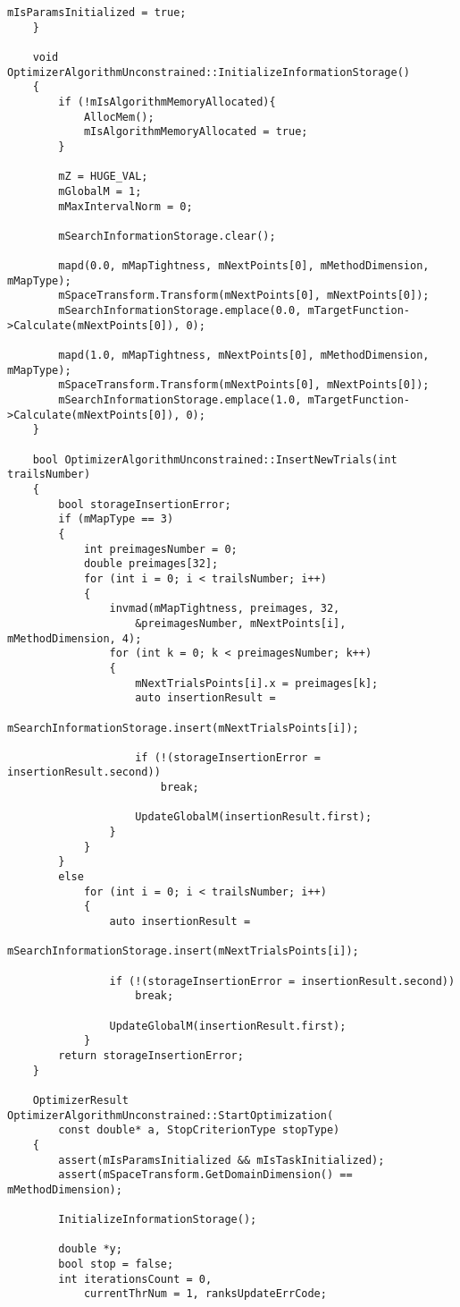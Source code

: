 \begin{lstlisting}[frame=single]
		mIsParamsInitialized = true;
	}

	void OptimizerAlgorithmUnconstrained::InitializeInformationStorage()
	{
		if (!mIsAlgorithmMemoryAllocated){
			AllocMem();
			mIsAlgorithmMemoryAllocated = true;
		}

		mZ = HUGE_VAL;
		mGlobalM = 1;
		mMaxIntervalNorm = 0;

		mSearchInformationStorage.clear();

		mapd(0.0, mMapTightness, mNextPoints[0], mMethodDimension, mMapType);
		mSpaceTransform.Transform(mNextPoints[0], mNextPoints[0]);
		mSearchInformationStorage.emplace(0.0, mTargetFunction->Calculate(mNextPoints[0]), 0);

		mapd(1.0, mMapTightness, mNextPoints[0], mMethodDimension, mMapType);
		mSpaceTransform.Transform(mNextPoints[0], mNextPoints[0]);
		mSearchInformationStorage.emplace(1.0, mTargetFunction->Calculate(mNextPoints[0]), 0);
	}

	bool OptimizerAlgorithmUnconstrained::InsertNewTrials(int trailsNumber)
	{
		bool storageInsertionError;
		if (mMapType == 3)
		{
			int preimagesNumber = 0;
			double preimages[32];
			for (int i = 0; i < trailsNumber; i++)
			{
				invmad(mMapTightness, preimages, 32,
					&preimagesNumber, mNextPoints[i], mMethodDimension, 4);
				for (int k = 0; k < preimagesNumber; k++)
				{
					mNextTrialsPoints[i].x = preimages[k];
					auto insertionResult =
						mSearchInformationStorage.insert(mNextTrialsPoints[i]);

					if (!(storageInsertionError = insertionResult.second))
						break;

					UpdateGlobalM(insertionResult.first);
				}
			}
		}
		else
			for (int i = 0; i < trailsNumber; i++)
			{
				auto insertionResult =
					mSearchInformationStorage.insert(mNextTrialsPoints[i]);

				if (!(storageInsertionError = insertionResult.second))
					break;

				UpdateGlobalM(insertionResult.first);
			}
		return storageInsertionError;
	}

	OptimizerResult OptimizerAlgorithmUnconstrained::StartOptimization(
		const double* a, StopCriterionType stopType)
	{
		assert(mIsParamsInitialized && mIsTaskInitialized);
		assert(mSpaceTransform.GetDomainDimension() == mMethodDimension);

		InitializeInformationStorage();

		double *y;
		bool stop = false;
		int iterationsCount = 0,
			currentThrNum = 1, ranksUpdateErrCode;


\end{lstlisting}
